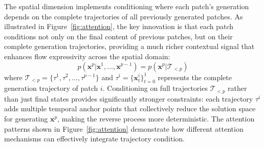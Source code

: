 \documentclass{article}
\theoremstyle{plain}
\theoremstyle{definition}
\theoremstyle{remark}
\begin{document}
The spatial dimension implements conditioning where each patch's generation depends on the complete trajectories of all previously generated patches. As illustrated in Figure~\ref{fig:attention}, the key innovation is that each patch conditions not only on the final content of previous patches, but on their complete generation trajectories, providing a much richer contextual signal that enhances flow expressivity across the spatial domain:
\begin{equation}
p(\mathbf{x}^p | \mathbf{x}^1, \dots, \mathbf{x}^{p-1}) = p(\mathbf{x}^p | \mathcal{T}_{<p})
\end{equation}
where $\mathcal{T}_{<p} = \{\tau^1, \tau^2, \dots, \tau^{p-1}\}$ and $\tau^i = \{\mathbf{x}_t^i\}_{t=0}^1$ represents the complete generation trajectory of patch $i$. Conditioning on full trajectories $\mathcal{T}_{<p}$ rather than just final states provides significantly stronger constraints: each trajectory $\tau^i$ adds multiple temporal anchor points that collectively reduce the solution space for generating $\mathbf{x}^p$, making the reverse process more deterministic. The attention patterns shown in Figure~\ref{fig:attention} demonstrate how different attention mechanisms can effectively integrate trajectory condition.


\vspace{-2mm}
\end{document}
